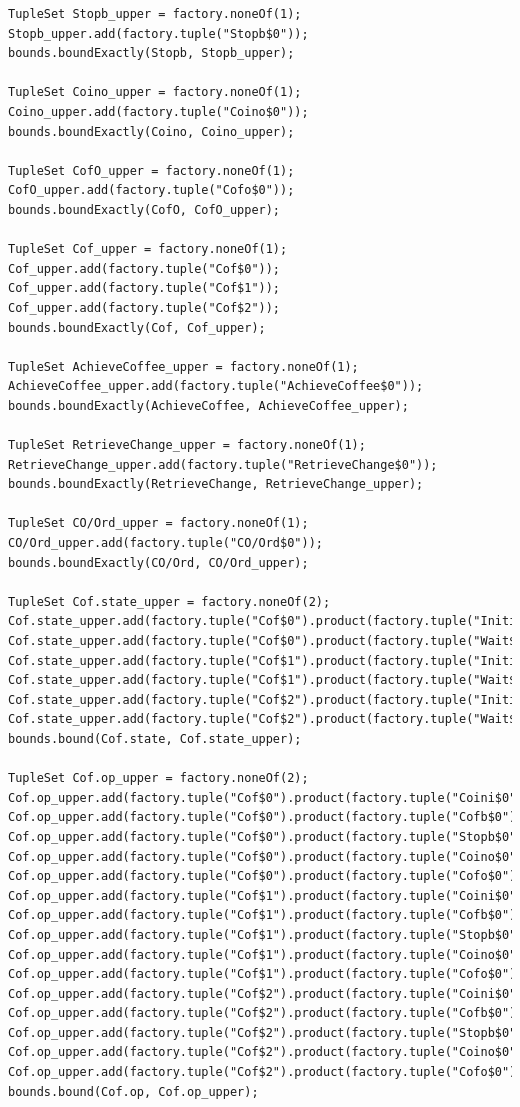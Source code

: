 \documentclass[a4paper,12pt]{report}
\begin{document}
\begin{onehalfspacing}
\begin{verbatim}
TupleSet Stopb_upper = factory.noneOf(1);
Stopb_upper.add(factory.tuple("Stopb$0"));
bounds.boundExactly(Stopb, Stopb_upper);

TupleSet Coino_upper = factory.noneOf(1);
Coino_upper.add(factory.tuple("Coino$0"));
bounds.boundExactly(Coino, Coino_upper);

TupleSet CofO_upper = factory.noneOf(1);
CofO_upper.add(factory.tuple("Cofo$0"));
bounds.boundExactly(CofO, CofO_upper);

TupleSet Cof_upper = factory.noneOf(1);
Cof_upper.add(factory.tuple("Cof$0"));
Cof_upper.add(factory.tuple("Cof$1"));
Cof_upper.add(factory.tuple("Cof$2"));
bounds.boundExactly(Cof, Cof_upper);

TupleSet AchieveCoffee_upper = factory.noneOf(1);
AchieveCoffee_upper.add(factory.tuple("AchieveCoffee$0"));
bounds.boundExactly(AchieveCoffee, AchieveCoffee_upper);

TupleSet RetrieveChange_upper = factory.noneOf(1);
RetrieveChange_upper.add(factory.tuple("RetrieveChange$0"));
bounds.boundExactly(RetrieveChange, RetrieveChange_upper);

TupleSet CO/Ord_upper = factory.noneOf(1);
CO/Ord_upper.add(factory.tuple("CO/Ord$0"));
bounds.boundExactly(CO/Ord, CO/Ord_upper);

TupleSet Cof.state_upper = factory.noneOf(2);
Cof.state_upper.add(factory.tuple("Cof$0").product(factory.tuple("Initial$0")));
Cof.state_upper.add(factory.tuple("Cof$0").product(factory.tuple("Wait$0")));
Cof.state_upper.add(factory.tuple("Cof$1").product(factory.tuple("Initial$0")));
Cof.state_upper.add(factory.tuple("Cof$1").product(factory.tuple("Wait$0")));
Cof.state_upper.add(factory.tuple("Cof$2").product(factory.tuple("Initial$0")));
Cof.state_upper.add(factory.tuple("Cof$2").product(factory.tuple("Wait$0")));
bounds.bound(Cof.state, Cof.state_upper);

TupleSet Cof.op_upper = factory.noneOf(2);
Cof.op_upper.add(factory.tuple("Cof$0").product(factory.tuple("Coini$0")));
Cof.op_upper.add(factory.tuple("Cof$0").product(factory.tuple("Cofb$0")));
Cof.op_upper.add(factory.tuple("Cof$0").product(factory.tuple("Stopb$0")));
Cof.op_upper.add(factory.tuple("Cof$0").product(factory.tuple("Coino$0")));
Cof.op_upper.add(factory.tuple("Cof$0").product(factory.tuple("Cofo$0")));
Cof.op_upper.add(factory.tuple("Cof$1").product(factory.tuple("Coini$0")));
Cof.op_upper.add(factory.tuple("Cof$1").product(factory.tuple("Cofb$0")));
Cof.op_upper.add(factory.tuple("Cof$1").product(factory.tuple("Stopb$0")));
Cof.op_upper.add(factory.tuple("Cof$1").product(factory.tuple("Coino$0")));
Cof.op_upper.add(factory.tuple("Cof$1").product(factory.tuple("Cofo$0")));
Cof.op_upper.add(factory.tuple("Cof$2").product(factory.tuple("Coini$0")));
Cof.op_upper.add(factory.tuple("Cof$2").product(factory.tuple("Cofb$0")));
Cof.op_upper.add(factory.tuple("Cof$2").product(factory.tuple("Stopb$0")));
Cof.op_upper.add(factory.tuple("Cof$2").product(factory.tuple("Coino$0")));
Cof.op_upper.add(factory.tuple("Cof$2").product(factory.tuple("Cofo$0")));
bounds.bound(Cof.op, Cof.op_upper);


\end{verbatim}
\end{onehalfspacing}
\end{document}
